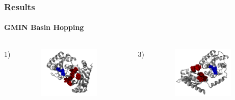 \documentclass[english]{beamer}
\begin{document}

\begin{frame}
    \frametitle{Results}
    \framesubtitle{GMIN Basin Hopping} 

    \vspace{0.06\topmargin}

    \begin{columns}[t]
        1)
        \vspace{-4ex}
        \begin{figure}
            \includegraphics[width=0.85\textwidth]{figures/Complex_structures/structure1.png}  
        \end{figure}      
        3)
        \vspace{-8ex}
        \begin{figure}
            \includegraphics[width=0.85\textwidth]{figures/Complex_structures/structure3.png}   
        \end{figure}       


\end{columns}
\end{frame}
\end{document}
